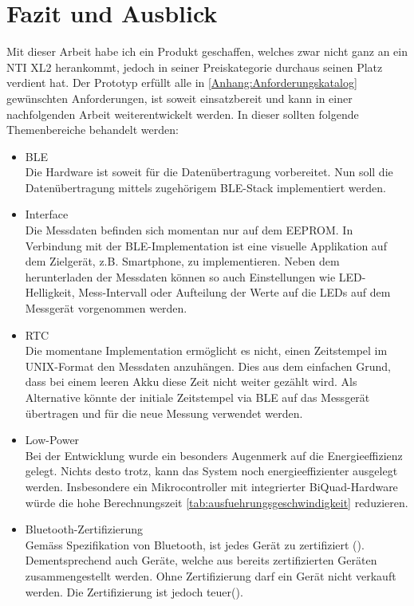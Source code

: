 \documentclass[12pt]{article}
\begin{document}
	\section{Fazit und Ausblick}
	Mit dieser Arbeit habe ich ein Produkt geschaffen, welches zwar nicht ganz an ein NTI XL2 herankommt, jedoch in seiner Preiskategorie durchaus seinen Platz verdient hat. Der Prototyp erfüllt alle in \ref{Anhang:Anforderungskatalog} gewünschten Anforderungen, ist soweit einsatzbereit und kann in einer nachfolgenden Arbeit weiterentwickelt werden. In dieser sollten folgende Themenbereiche behandelt werden:
	\begin{itemize}
		\item BLE \\
		Die Hardware ist soweit für die Datenübertragung vorbereitet. Nun soll die Datenübertragung mittels zugehörigem BLE-Stack implementiert werden.
		\item Interface \\
		Die Messdaten befinden sich momentan nur auf dem EEPROM. In Verbindung mit der BLE-Implementation ist eine visuelle Applikation auf dem Zielgerät, z.B. Smartphone, zu implementieren. Neben dem herunterladen der Messdaten können so auch Einstellungen wie LED-Helligkeit, Mess-Intervall oder Aufteilung der Werte auf die LEDs auf dem Messgerät vorgenommen werden.
		\item RTC \\
		Die momentane Implementation ermöglicht es nicht, einen Zeitstempel im UNIX-Format den Messdaten anzuhängen. Dies aus dem einfachen Grund, dass bei einem leeren Akku diese Zeit nicht weiter gezählt wird. Als Alternative könnte der initiale Zeitstempel via BLE auf das Messgerät übertragen und für die neue Messung verwendet werden.
		\item Low-Power \\
		Bei der Entwicklung wurde ein besonders Augenmerk auf die Energieeffizienz gelegt. Nichts desto trotz, kann das System noch energieeffizienter ausgelegt werden. Insbesondere ein Mikrocontroller mit integrierter BiQuad-Hardware würde die hohe Berechnungszeit \ref{tab:ausfuehrungsgeschwindigkeit} reduzieren.
		\item Bluetooth-Zertifizierung\\
		Gemäss Spezifikation von Bluetooth, ist jedes Gerät zu zertifiziert (\cite{noauthor_bluetooth_nodate-1}). Dementsprechend auch Geräte, welche aus bereits zertifizierten Geräten zusammengestellt werden. Ohne Zertifizierung darf ein Gerät nicht verkauft werden. Die Zertifizierung ist jedoch teuer(\cite{noauthor_bluetooth_nodate}).
	\end{itemize}
	
\end{document}

